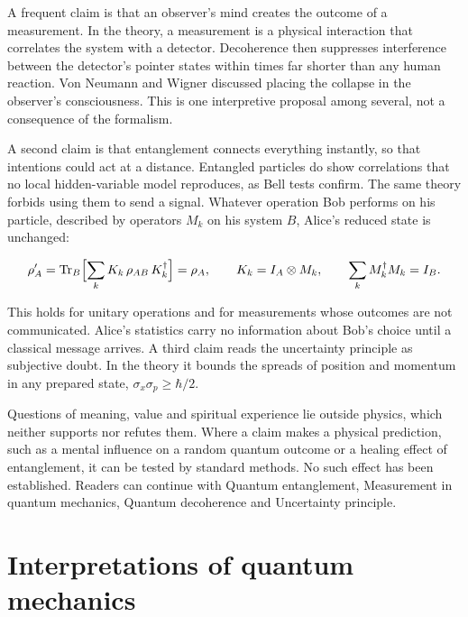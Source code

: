 \documentclass[11pt,oneside]{book}
\newenvironment{centeredalign}{\[\begin{gathered}[c]}{\end{gathered}\]}
\begin{document}
A frequent claim is that an observer's mind creates the outcome of a measurement. In the theory, a measurement is a physical interaction that correlates the system with a detector. Decoherence then suppresses interference between the detector's pointer states within times far shorter than any human reaction. Von Neumann and Wigner discussed placing the collapse in the observer's consciousness. This is one interpretive proposal among several, not a consequence of the formalism.

A second claim is that entanglement connects everything instantly, so that intentions could act at a distance. Entangled particles do show correlations that no local hidden-variable model reproduces, as Bell tests confirm. The same theory forbids using them to send a signal. Whatever operation Bob performs on his particle, described by operators \(M_k\) on his system \(B\), Alice's reduced state is unchanged:

\begin{centeredalign}
\rho_A'=\operatorname{Tr}_B\Bigl[\sum_kK_k\,\rho_{AB}\,K_k^\dagger\Bigr]=\rho_A,\qquad
K_k=I_A\otimes M_k,\qquad \sum_kM_k^\dagger M_k=I_B .
\end{centeredalign}

This holds for unitary operations and for measurements whose outcomes are not communicated. Alice's statistics carry no information about Bob's choice until a classical message arrives. A third claim reads the uncertainty principle as subjective doubt. In the theory it bounds the spreads of position and momentum in any prepared state, \(\sigma_x\sigma_p\geq\hbar/2\).

Questions of meaning, value and spiritual experience lie outside physics, which neither supports nor refutes them. Where a claim makes a physical prediction, such as a mental influence on a random quantum outcome or a healing effect of entanglement, it can be tested by standard methods. No such effect has been established. Readers can continue with Quantum entanglement, Measurement in quantum mechanics, Quantum decoherence and Uncertainty principle.







\clearpage

\section{Interpretations of quantum mechanics}
\end{document}
